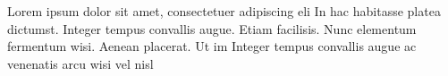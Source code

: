 \documentclass[11pt,a4paper]{article}
\begin{document}
Lorem ipsum dolor sit amet, consectetuer adipiscing eli In hac habitasse platea dictumst. Integer tempus convallis augue. 
Etiam facilisis. Nunc elementum fermentum wisi. Aenean placerat. Ut im  Integer tempus convallis augue
ac venenatis arcu wisi vel nisl  

{


}
\end{document}
